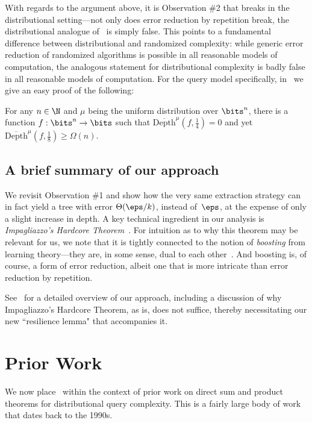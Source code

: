 \documentclass[11pt]{article}
\begin{document}
With regards to the argument above, it is Observation \#2 that breaks in the distributional setting---not only does error reduction by repetition break, the distributional analogue of~ is simply false. This points to a fundamental difference between distributional and randomized complexity: while generic error reduction of randomized algorithms is possible in all reasonable models of computation, the analogous statement for distributional complexity is badly false in all reasonable models of computation. For the query model specifically, in~ we give an easy proof of the following: 

\begin{fact}
    \label{fact:no-boosting}
    For any $n \in \N$ and $\mu$ being the uniform distribution over $\bits^n$, there is a function $f:\bits^n \to \bits$ such that $\overline{\mathrm{Depth}}^{\mu}(f,\tfrac{1}{4}) = 0$ and yet $\overline{\mathrm{Depth}}^{\mu}(f,\tfrac{1}{8}) \geq \Omega(n).$
\end{fact}


\subsection{A brief summary of our approach}
We revisit Observation \#1 and show how the very same extraction strategy can in fact yield a tree with error $\Theta(\eps/k)$, instead of~$\eps$, at the expense of only a slight increase in depth.  A key technical ingredient in our analysis is {\sl Impagliazzo's Hardcore Theorem}~\cite{Imp95}. For intuition as to why this theorem may be relevant for us, we note that it is tightly connected to the notion of {\sl boosting} from learning theory---they are, in some sense, dual to each other~\cite{KS03}. And boosting is, of course, a form of error reduction, albeit one that is more intricate than error reduction by repetition. 

See~ for a detailed overview of our approach, including a discussion of why Impagliazzo's Hardcore Theorem, as is, does not suffice, thereby necessitating our new ``resilience lemma" that accompanies it.  


    
\section{Prior Work}
\label{sec:background}

We now place~ within the context of prior work on direct sum and product theorems for distributional query complexity. This is a fairly large body of work that dates back to the 1990s. 
\end{document}
